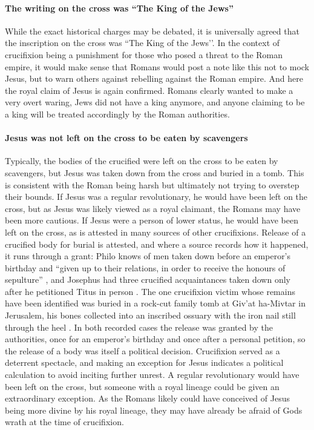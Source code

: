 \paragraph{The writing on the cross was ``The King of the Jews''}\label{par:the-writing-on-the-cross-was-the-king-of-the-jews}
While the exact historical charges may be debated, it is universally agreed that the inscription on the cross was ``The King of the Jews’’.
In the context of crucifixion being a punishment for those who posed a threat to the Roman empire, it would make sense that Romans would post a note like this not to mock Jesus, but to warn others against rebelling against the Roman empire.
And here the royal claim of Jesus is again confirmed.
Romans clearly wanted to make a very overt waring, Jews did not have a king anymore, and anyone claiming to be a king will be treated accordingly by the Roman authorities.
\paragraph{Jesus was not left on the cross to be eaten by scavengers}\label{par:jesus-was-not-left-on-the-cross-to-be-eaten-by-scavengers.}
Typically, the bodies of the crucified were left on the cross to be eaten by scavengers, but Jesus was taken down from the cross and buried in a tomb.
This is consistent with the Roman being harsh but ultimately not trying to overstep their bounds.
If Jesus was a regular revolutionary, he would have been left on the cross, but as Jesus was likely viewed as a royal claimant, the Romans may have been more cautious.
If Jesus were a person of lower status, he would have been left on the cross, as is attested in many sources of other crucifixions.
Release of a crucified body for burial is attested, and where a source records how it happened, it runs through a grant: Philo knows of men taken down before an emperor's birthday and ``given up to their relations, in order to receive the honours of sepulture'' \cite[83]{philo:flaccum}, and Josephus had three crucified acquaintances taken down only after he petitioned Titus in person \cite[420--421]{josephus:life}.
The one crucifixion victim whose remains have been identified was buried in a rock-cut family tomb at Giv'at ha-Mivtar in Jerusalem, his bones collected into an inscribed ossuary with the iron nail still through the heel \cite{zias:crucified}.
In both recorded cases the release was granted by the authorities, once for an emperor's birthday and once after a personal petition, so the release of a body was itself a political decision.
Crucifixion served as a deterrent spectacle, and making an exception for Jesus indicates a political calculation to avoid inciting further unrest.
A regular revolutionary would have been left on the cross, but someone with a royal lineage could be given an extraordinary exception.
As the Romans likely could have conceived of Jesus being more divine by his royal lineage, they may have already be afraid of Gods wrath at the time of crucifixion.


